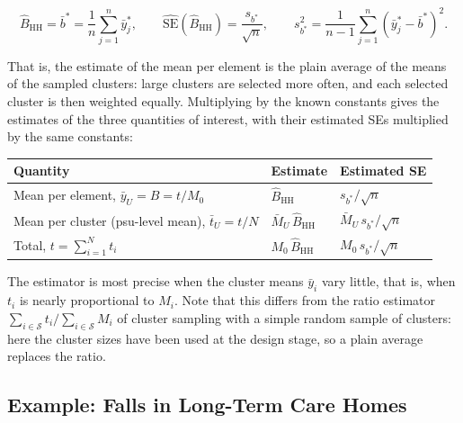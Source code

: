 \documentclass[
  letterpaper,
  DIV=11,
  numbers=noendperiod]{scrreprt}
\newcounter{none} %
\renewcommand{\[}{\begin{equation}}
\renewcommand{\]}{\end{equation}}
\begin{document}
\[
\boxed{\hat{B}_{\mathrm{HH}}=\bar{b}^*=\frac{1}{n}\sum_{j=1}^n \bar{y}_j^*},\qquad
\widehat{\mathrm{SE}}(\hat{B}_{\mathrm{HH}})=\frac{s_{b^*}}{\sqrt{n}},\qquad
s_{b^*}^2=\frac{1}{n-1}\sum_{j=1}^n\left(\bar{y}_j^*-\bar{b}^*\right)^2 .
\]

That is, the estimate of the mean per element is the plain average of
the means of the sampled clusters: large clusters are selected more
often, and each selected cluster is then weighted equally. Multiplying
by the known constants gives the estimates of the three quantities of
interest, with their estimated SEs multiplied by the same constants:

{\def\LTcaptype{none} %
\begin{longtable}[]{@{}
  >{\raggedright\arraybackslash}p{}
  >{\raggedright\arraybackslash}p{}
  >{\raggedright\arraybackslash}p{}@{}}
\toprule\noalign{}
\begin{minipage}[b]{\linewidth}\raggedright
Quantity
\end{minipage} & \begin{minipage}[b]{\linewidth}\raggedright
Estimate
\end{minipage} & \begin{minipage}[b]{\linewidth}\raggedright
Estimated SE
\end{minipage} \\
\midrule\noalign{}
\endhead
\bottomrule\noalign{}
\endlastfoot
Mean per element, \(\bar{y}_U=B=t/M_0\) & \(\hat{B}_{\mathrm{HH}}\) &
\(s_{b^*}/\sqrt{n}\) \\
Mean per cluster (psu-level mean), \(\bar{t}_U=t/N\) &
\(\bar{M}_U\,\hat{B}_{\mathrm{HH}}\) &
\(\bar{M}_U\,s_{b^*}/\sqrt{n}\) \\
Total, \(t=\sum_{i=1}^N t_i\) & \(M_0\,\hat{B}_{\mathrm{HH}}\) &
\(M_0\,s_{b^*}/\sqrt{n}\) \\
\end{longtable}
}

The estimator is most precise when the cluster means \(\bar{y}_i\) vary
little, that is, when \(t_i\) is nearly proportional to \(M_i\). Note
that this differs from the ratio estimator
\(\sum_{i\in\mathcal{S}}t_i/\sum_{i\in\mathcal{S}}M_i\) of cluster
sampling with a simple random sample of clusters: here the cluster sizes
have been used at the design stage, so a plain average replaces the
ratio.

\subsection{Example: Falls in Long-Term Care
Homes}\label{sec-ups-cluster-example}
\end{document}
